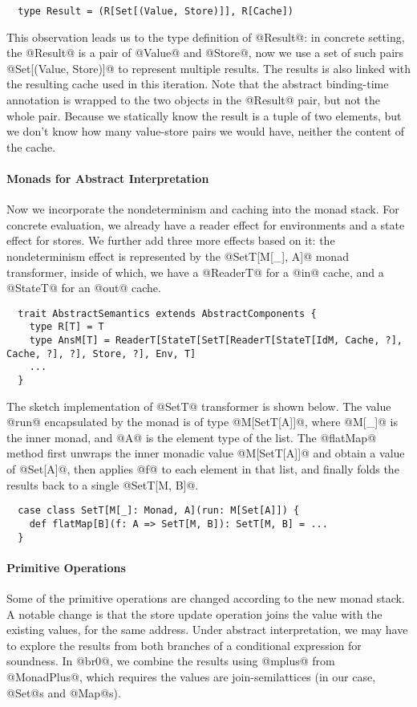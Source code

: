 \begin{lstlisting}
  type Result = (R[Set[(Value, Store)]], R[Cache])
\end{lstlisting}

This observation leads us to the type definition of @Result@: in concrete setting,
the @Result@ is a pair of @Value@ and @Store@, now we use a set of such pairs
@Set[(Value, Store)]@ to represent multiple results. The results is also linked
with the resulting cache used in this iteration.
Note that the abstract binding-time annotation is wrapped to the two objects in
the @Result@ pair, but not the whole pair. Because we statically know the result
is a tuple of two elements, but we don't know how many value-store pairs we
would have, neither the content of the cache.

\paragraph{Monads for Abstract Interpretation} Now we incorporate the
nondeterminism and caching into the monad stack. For concrete evaluation, we
already have a reader effect for environments and a state effect for stores. We
further add three more effects based on it: the nondeterminism effect is
represented by the @SetT[M[_], A]@ monad transformer, inside of which, we have
a @ReaderT@ for a @in@ cache, and a @StateT@ for an @out@ cache. 

\begin{lstlisting}
  trait AbstractSemantics extends AbstractComponents {
    type R[T] = T
    type AnsM[T] = ReaderT[StateT[SetT[ReaderT[StateT[IdM, Cache, ?], Cache, ?], ?], Store, ?], Env, T]
    ...
  }
\end{lstlisting}

The sketch implementation of @SetT@ transformer is shown below. The value @run@
encapsulated by the monad is of type @M[SetT[A]]@, where @M[_]@ is the inner monad, and
@A@ is the element type of the list. The @flatMap@ method first unwraps the inner
monadic value @M[SetT[A]]@ and obtain a value of @Set[A]@, then applies @f@ to
each element in that list, and finally folds the results back to a single
@SetT[M, B]@.

\begin{lstlisting}
  case class SetT[M[_]: Monad, A](run: M[Set[A]]) {
    def flatMap[B](f: A => SetT[M, B]): SetT[M, B] = ...
  }
\end{lstlisting}

\paragraph{Primitive Operations} Some of the primitive operations are changed
according to the new monad stack. A notable change is that the store update
operation joins the value with the existing values, for the same address. Under
abstract interpretation, we may have to explore the results from both branches
of a conditional expression for soundness. In @br0@, we combine the results
using @mplus@ from @MonadPlus@, which requires the values are join-semilattices
(in our case, @Set@s and @Map@s).

